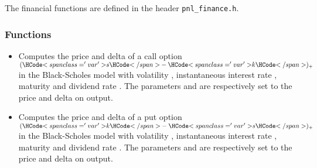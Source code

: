 The financial functions are defined in the header \verb!pnl_finance.h!.\\

\subsubsection{Functions}


\begin{itemize}
\item
  \sshortdescribe Computes the price and delta of a call option $(\var{s} -
  \var{k})_+$ in the Black-Scholes model with volatility ,
  instantaneous interest rate , maturity  and dividend rate
  . The parameters  and  are respectively
  set to the price and delta on output.

\item
  \sshortdescribe Computes the price and delta of a put option $(\var{k} - 
  \var{s})_+$ in the Black-Scholes model with volatility ,
  instantaneous interest rate , maturity  and dividend rate
  .  The parameters  and  are respectively
  set to the price and delta on output.

\end{itemize}


